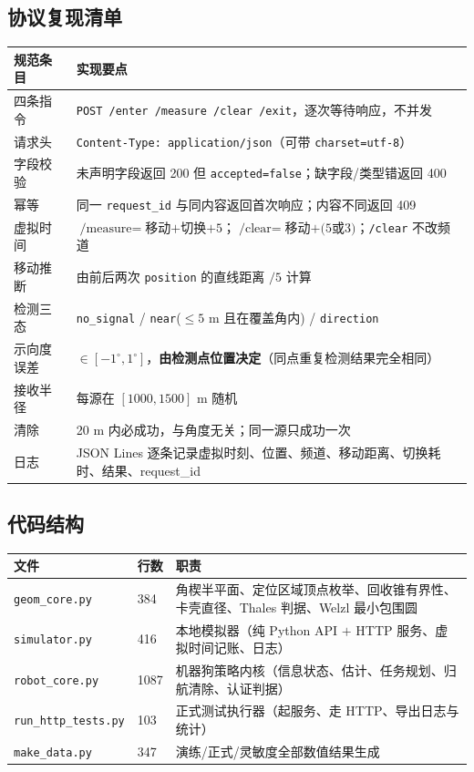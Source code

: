 \subsection{协议复现清单}

\begin{center}
\begin{tabular}{p{5.2cm}p{9.6cm}}
\toprule
规范条目 & 实现要点 \\ \midrule
四条指令 & \texttt{POST /enter /measure /clear /exit}，逐次等待响应，不并发 \\
请求头 & \texttt{Content-Type: application/json}（可带 \texttt{charset=utf-8}） \\
字段校验 & 未声明字段返回 200 但 \texttt{accepted=false}；缺字段/类型错返回 400 \\
幂等 & 同一 \texttt{request\_id} 与同内容返回首次响应；内容不同返回 409 \\
虚拟时间 & $\text{/measure}=$移动$+$切换$+5$；$\text{/clear}=$移动$+(5$或$3)$；\texttt{/clear} 不改频道 \\
移动推断 & 由前后两次 \texttt{position} 的直线距离 $/5$ 计算 \\
检测三态 & \texttt{no\_signal} / \texttt{near}($\le5$ m 且在覆盖角内) / \texttt{direction} \\
示向度误差 & $\in[-1^{\circ},1^{\circ}]$，\textbf{由检测点位置决定}（同点重复检测结果完全相同） \\
接收半径 & 每源在 $[1000,1500]$ m 随机 \\
清除 & 20 m 内必成功，与角度无关；同一源只成功一次 \\
日志 & JSON Lines 逐条记录虚拟时刻、位置、频道、移动距离、切换耗时、结果、request\_id \\
\bottomrule
\end{tabular}
\end{center}

\subsection{代码结构}

\begin{center}
\begin{tabular}{llp{8.4cm}}
\toprule
文件 & 行数 & 职责 \\ \midrule
\texttt{geom\_core.py} & 384 & 角楔半平面、定位区域顶点枚举、回收锥有界性、卡壳直径、Thales 判据、Welzl 最小包围圆 \\
\texttt{simulator.py} & 416 & 本地模拟器（纯 Python API $+$ HTTP 服务、虚拟时间记账、日志） \\
\texttt{robot\_core.py} & 1087 & 机器狗策略内核（信息状态、估计、任务规划、归航清除、认证判据） \\
\texttt{run\_http\_tests.py} & 103 & 正式测试执行器（起服务、走 HTTP、导出日志与统计） \\
\texttt{make\_data.py} & 347 & 演练/正式/灵敏度全部数值结果生成 \\
\bottomrule
\end{tabular}
\end{center}


